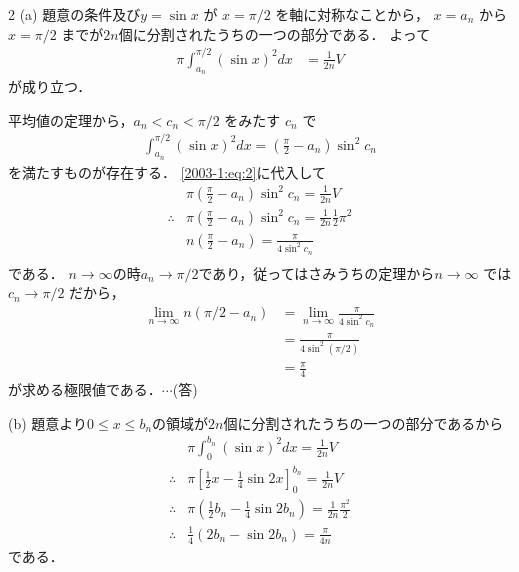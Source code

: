 \documentclass[../../../../main.tex]{subfiles}
\begin{document}
\begin{multicols}{2}
    \vspace{10pt}
    (a)
    題意の条件及び$y = \sin x$ が $x = \pi/2$ を軸に対称なことから，
    $x=a_n$ から $x = \pi/2$ までが$2n$個に分割されたうちの一つの部分である．
    よって
    \begin{align}
        \pi \int_{a_n}^{\pi/2} (\sin x)^2 dx & = \frac{1}{2n}V \label{2003-1:eq:3}
    \end{align}
    が成り立つ．

    平均値の定理から，$a_n < c_n < \pi/2$ をみたす $c_n$ で
    \begin{align*}
        \int_{a_n}^{\pi/2} (\sin x)^2 dx = \left(\frac{\pi}{2}-a_n\right)\sin^2 c_n
    \end{align*}
    を満たすものが存在する．
    \cref{2003-1:eq:2}に代入して
    \begin{align*}
         & \pi \left(\frac{\pi}{2} - a_n\right) \sin^2 c_n  = \frac{1}{2n}V                 \\
        \therefore
         & \pi \left(\frac{\pi}{2} - a_n\right) \sin^2 c_n  = \frac{1}{2n} \frac{1}{2}\pi^2 \\
         & n \left(\frac{\pi}{2} - a_n\right)   = \frac{\pi}{4\sin^2 c_n}                   \\
    \end{align*}
    である．
    $n \to \infty$の時$a_n \to \pi/2$であり，従ってはさみうちの定理から$n \to \infty$ では $c_n \to \pi/2$ だから，
    \begin{align*}
        \lim_{n \to \infty} n(\pi/2 - a_n)
         & = \lim_{n \to \infty} \frac{\pi}{4 \sin^2 c_n} \\
         & = \frac{\pi}{4 \sin^2(\pi/2)}                  \\
         & = \frac{\pi}{4}
    \end{align*}
    が求める極限値である．$\cdots$(答)
    \vspace{10pt}

    (b) 題意より$0 \le x \le b_n$の領域が$2n$個に分割されたうちの一つの部分であるから
    \begin{align}
         & \pi \int_0^{b_n} (\sin x)^2 dx                                = \frac{1}{2n}V                        \\
        \therefore
         & \pi \left[ \frac{1}{2}x - \frac{1}{4}\sin 2x \right]_0^{b_n}  = \frac{1}{2n}V                        \\
        \therefore
         & \pi \left( \frac{1}{2}b_n - \frac{1}{4}\sin 2b_n \right)      = \frac{1}{2n} \frac{\pi^2}{2}         \\
        \therefore
         & \frac{1}{4}\left(2b_n - \sin 2b_n\right)                        = \frac{\pi}{4n} \label{2003-1:eq:4}
    \end{align}
    である．


\end{multicols}
\end{document}
